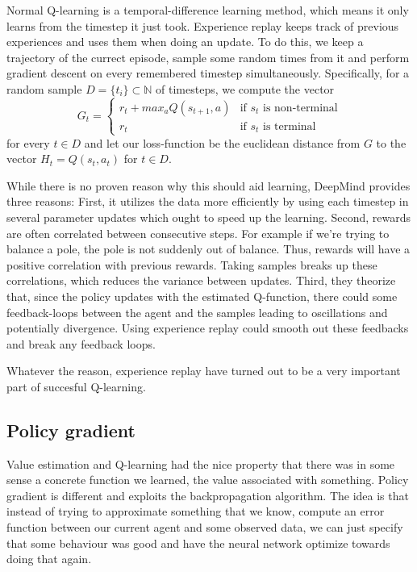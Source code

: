 \documentclass{article}
\theoremstyle{changedot}
\theoremstyle{changedotbreak}
\theoremstyle{nonumberplain}
\begin{document}
Normal Q-learning is a temporal-difference learning method, which means it only learns from the timestep it just took. Experience replay keeps track of previous experiences and uses them when doing an update. To do this, we keep a trajectory of the currect episode, sample some random times from it and perform gradient descent on every remembered timestep simultaneously. Specifically, for a random sample $D = \{t_{i}\} \subset \mathbb N$ of timesteps, we compute the vector
\[G_{t} =  \begin{cases}
    r_{t} + max_{a} Q(s_{t+1}, a) & \text{if $s_{t}$ is non-terminal} \\
    r_{t} & \text{if $s_{t}$ is terminal}
  \end{cases} \]
for every $t \in D$ and let our loss-function be the euclidean distance from $G$ to the vector $H_{t} = Q(s_{t}, a_{t})$ for $t \in D$.

While there is no proven reason why this should aid learning, DeepMind provides three reasons: First, it utilizes the data more efficiently by using each timestep in several parameter updates which ought to speed up the learning. Second, rewards are often correlated between consecutive steps. For example if we're trying to balance a pole, the pole is not suddenly out of balance. Thus, rewards will have a positive correlation with previous rewards. Taking samples breaks up these correlations, which reduces the variance between updates. Third, they theorize that, since the policy updates with the estimated Q-function, there could some feedback-loops between the agent and the samples leading to oscillations and potentially divergence. Using experience replay could smooth out these feedbacks and break any feedback loops.

Whatever the reason, experience replay have turned out to be a very important part of succesful Q-learning.

\subsection{Policy gradient}
Value estimation and Q-learning had the nice property that there was in some sense a concrete function we learned, the value associated with something. Policy gradient is different and exploits the backpropagation algorithm. The idea is that instead of trying to approximate something that we know, compute an error function between our current agent and some observed data, we can just specify that some behaviour was good and have the neural network optimize towards doing that again.
\end{document}

